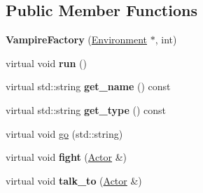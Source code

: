 \subsection*{Public Member Functions}
\begin{DoxyCompactItemize}
\item 
\hypertarget{classda__game_1_1VampireFactory_a9a3e0ab44708348be1caf55d7de920d5}{
{\bfseries VampireFactory} (\hyperlink{classda__game_1_1Environment}{Environment} $\ast$, int)}
\label{classda__game_1_1VampireFactory_a9a3e0ab44708348be1caf55d7de920d5}

\item 
\hypertarget{classda__game_1_1VampireFactory_a5981dc60b9f6fae2ce999e4555106d79}{
virtual void {\bfseries run} ()}
\label{classda__game_1_1VampireFactory_a5981dc60b9f6fae2ce999e4555106d79}

\item 
\hypertarget{classda__game_1_1VampireFactory_a9e156f9b668e710fb81cc4c0028cde17}{
virtual std::string {\bfseries get\_\-name} () const }
\label{classda__game_1_1VampireFactory_a9e156f9b668e710fb81cc4c0028cde17}

\item 
\hypertarget{classda__game_1_1VampireFactory_a4f48868efb55fb3b85c89738a0ab7c7d}{
virtual std::string {\bfseries get\_\-type} () const }
\label{classda__game_1_1VampireFactory_a4f48868efb55fb3b85c89738a0ab7c7d}

\item 
virtual void \hyperlink{classda__game_1_1VampireFactory_ab8f8fffebef4af1a90d00a0f011b245b}{go} (std::string)
\item 
\hypertarget{classda__game_1_1VampireFactory_a45b83b5acb2b73c475b9833119b9763b}{
virtual void {\bfseries fight} (\hyperlink{classda__game_1_1Actor}{Actor} \&)}
\label{classda__game_1_1VampireFactory_a45b83b5acb2b73c475b9833119b9763b}

\item 
\hypertarget{classda__game_1_1VampireFactory_a6cc92702b9e963c5e62340ec4036cd39}{
virtual void {\bfseries talk\_\-to} (\hyperlink{classda__game_1_1Actor}{Actor} \&)}
\label{classda__game_1_1VampireFactory_a6cc92702b9e963c5e62340ec4036cd39}

\end{DoxyCompactItemize}


